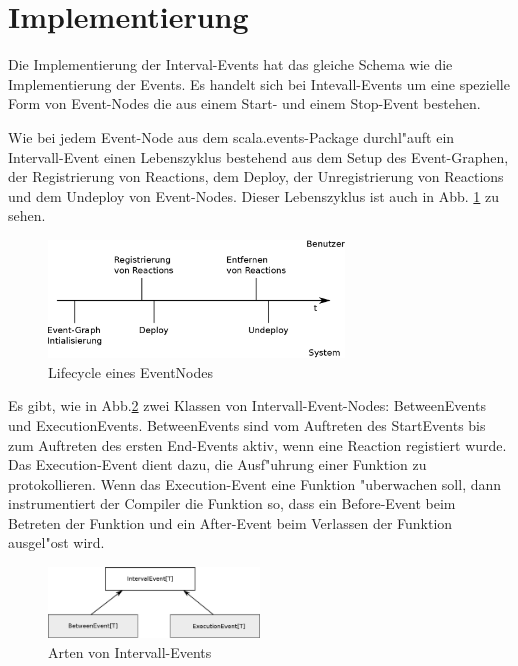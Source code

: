 \section{Implementierung}

Die Implementierung der Interval-Events hat das gleiche Schema wie die
Implementierung der Events. Es handelt sich bei Intevall-Events um eine
spezielle Form von Event-Nodes die aus einem Start- und einem Stop-Event
bestehen.

Wie bei jedem Event-Node aus dem scala.events-Package durchl"auft ein
Intervall-Event einen Lebenszyklus bestehend aus dem Setup des Event-Graphen,
der Registrierung von Reactions, dem Deploy, der Unregistrierung von Reactions
und dem Undeploy von Event-Nodes. Dieser Lebenszyklus ist auch in
Abb. \ref{event_node_lifecycle} zu sehen.

\begin{figure}[htp]
\begin{center}
  \includegraphics[width=0.7\textwidth]{graphics/EventNode-Lifecycle}
  \caption{Lifecycle eines EventNodes}
  \label{event_node_lifecycle}
\end{center}
\end{figure}


Es gibt, wie in Abb.\ref{interval_events_structure} zwei Klassen von
Intervall-Event-Nodes: BetweenEvents und ExecutionEvents. BetweenEvents sind vom
Auftreten des StartEvents bis zum Auftreten des ersten End-Events aktiv, wenn
eine Reaction registiert wurde. Das Execution-Event dient dazu, die Ausf"uhrung
einer Funktion zu protokollieren. Wenn das Execution-Event eine Funktion
"uberwachen soll, dann instrumentiert der Compiler die Funktion so, dass ein
Before-Event beim Betreten der Funktion und ein After-Event beim Verlassen der
Funktion ausgel"ost wird.

\begin{figure}[htp]
\begin{center}
  \includegraphics[width=0.5\textwidth]{graphics/interval_event_structure}
  \caption{Arten von Intervall-Events}
  \label{interval_events_structure}
\end{center}
\end{figure}

